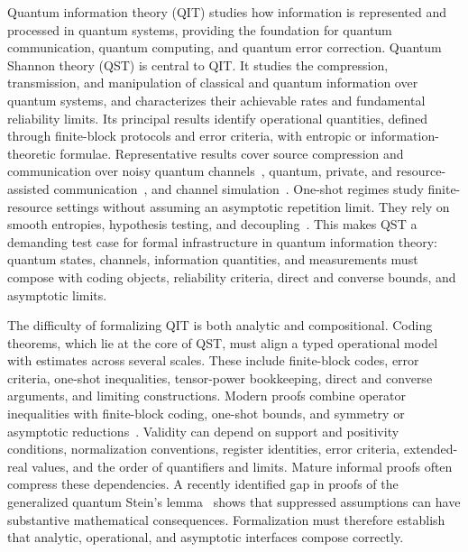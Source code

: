 \documentclass[10pt,a4paper]{article}
\begin{document}
Quantum information theory (QIT) studies how information is represented and processed in quantum systems, providing the foundation for quantum communication, quantum computing, and quantum error correction. Quantum Shannon theory (QST) is central to QIT. It studies the compression, transmission, and manipulation of classical and quantum information over quantum systems, and characterizes their achievable rates and fundamental reliability limits. Its principal results identify operational quantities, defined through finite-block protocols and error criteria, with entropic or information-theoretic formulae. Representative results cover source compression and communication over noisy quantum channels~\cite{Schumacher1995,Holevo1998,Schumacher1996}, quantum, private, and resource-assisted communication~\cite{Lloyd1997,Devetak2005,Bennett1996Purification,Bennett1996MixedState,Bennett1999,Bennett2002}, and channel simulation~\cite{Bennett2014QRST,Berta2011QRSTOneShot}. One-shot regimes study finite-resource settings without assuming an asymptotic repetition limit. They rely on smooth entropies, hypothesis testing, and decoupling~\cite{Renner2005,Tomamichel2015,Abeyesinghe2006,Wilde2017}. This makes QST a demanding test case for formal infrastructure in quantum information theory: quantum states, channels, information quantities, and measurements must compose with coding objects, reliability criteria, direct and converse bounds, and asymptotic limits.

The difficulty of formalizing QIT is both analytic and compositional. Coding theorems, which lie at the core of QST, must align a typed operational model with estimates across several scales. These include finite-block codes, error criteria, one-shot inequalities, tensor-power bookkeeping, direct and converse arguments, and limiting constructions. Modern proofs combine operator inequalities with finite-block coding, one-shot bounds, and symmetry or asymptotic reductions~\cite{Wilde2017,KhatriLamiWilde2025Principles}. Validity can depend on support and positivity conditions, normalization conventions, register identities, error criteria, extended-real values, and the order of quantifiers and limits. Mature informal proofs often compress these dependencies. A recently identified gap in proofs of the generalized quantum Stein's lemma~\cite{Berta2023} shows that suppressed assumptions can have substantive mathematical consequences. Formalization must therefore establish that analytic, operational, and asymptotic interfaces compose correctly.
\end{document}
